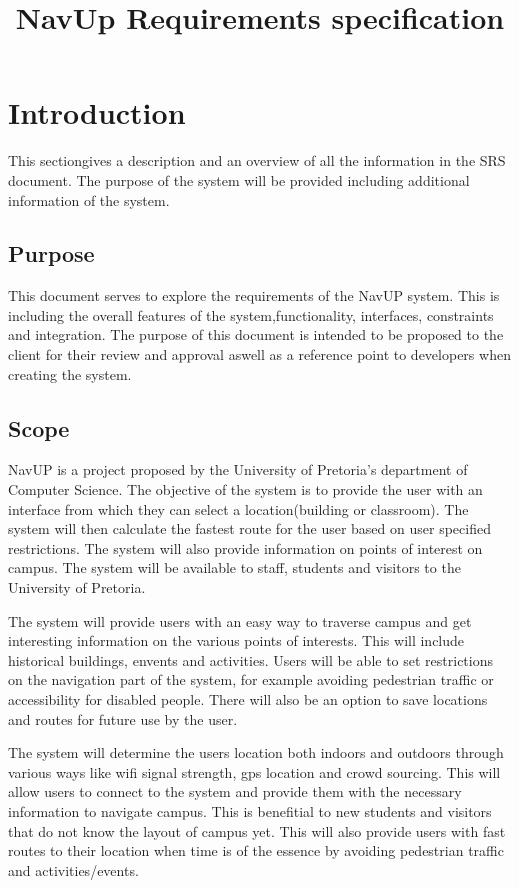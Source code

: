 \documentclass{article}
\begin{document}
\title{NavUp Requirements specification}
\maketitle
\newpage
{\let\cleardoublepage\clearpage 
\maketitle
\tableofcontents
}
\section{Introduction}
This sectiongives a description and an overview of all the information in the SRS document. The purpose of the system will be provided including additional information of the system.	 
	\subsection{Purpose}
	
This document serves to explore the requirements of the NavUP system. This is including the overall features of the system,functionality, interfaces, constraints and integration. The purpose of this document is intended to be proposed to the client for their review and approval aswell as a reference point to developers when creating the system.
	\subsection{Scope}
	
NavUP is a project proposed by the University of Pretoria’s department of Computer Science. The objective of the system is to provide the user with an interface from which they can select a location(building or classroom). The system will then calculate the fastest route for the user based on user specified restrictions. The system will also provide information on points of interest on campus. The system will be available to staff, students and visitors to the University of Pretoria.

The system will provide users with an easy way to traverse campus and get interesting information on the various points of interests. This will include historical buildings, envents and activities. Users will be able to set restrictions on the navigation part of the system, for example avoiding pedestrian traffic or accessibility for disabled people. There will also be an option to save locations and routes for future use by the user.

The system will determine the users location both indoors and outdoors through various ways like wifi signal strength, gps location and crowd sourcing. This will allow users to connect to the system and provide them with the necessary information to navigate campus. This is benefitial to new students and visitors that do not know the layout of campus yet. This will also provide users with fast routes to their location when time is of the essence by avoiding pedestrian traffic and activities/events.
\end{document}
